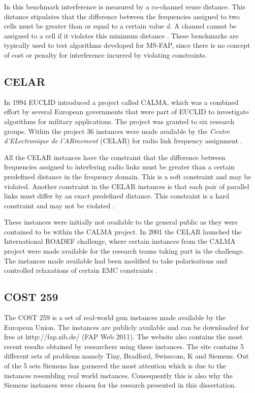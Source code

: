 In this benchmark interference is measured by a co-channel reuse distance\cite{Karen2004}. This distance stipulates that the difference between the frequencies  assigned to two cells must be greater than or equal to a certain value $d$. A channel cannot be assigned to a cell if it violates this minimum distance \cite{ExactMIFAP}.
These benchmarks are typically used to test algorithms developed for \gls{MS-FAP}, since there is no concept of cost or penalty for interference incurred by violating constraints.
\subsection{CELAR}
In 1994 \gls{EUCLID} introduced a project called CALMA, which was a combined effort by several European governments that were part of \gls{EUCLID} to investigate algorithms for military applications\cite{Karen2004}. The project was granted to six research groups. Within the project 36 instances were made available by the \emph{Centre d'ELectronique de l'ARmement} (CELAR) for radio link frequency assignment \cite{Karen2004,DynamicFAP}.

All the CELAR instances have the constraint that the difference between frequencies assigned to interfering radio links must be greater than a certain predefined distance in the frequency domain\cite{Karen2004}. This is a soft constraint and may be violated. Another constraint in the CELAR instances is that each pair of parallel links must differ by an exact predefined distance\cite{Karen2004}. This constraint is a hard constraint and may not be violated \cite{DynamicFAP}.

These instances were initially not available to the general public as they were contained to be within the CALMA project\cite{CALMA}. In 2001 the CELAR launched the International ROADEF challenge, where certain instances from the CALMA project were made available for the research teams taking part in the challenge\cite{CALMA}. The instances made available had been modified to take polarisations and controlled relaxations of certain EMC constraints \cite{LowerPolarFAP}.
\subsection{COST 259}
\label{sec:COST259}
The \gls{COST} 259 is a set of real-world \gls{gsm} instances made available by the European Union. The instances are publicly available and can  be downloaded for free at http://fap.zib.de/ (FAP Web 2011). The website also contains the most recent results obtained by researchers using these instances\cite{Karen2004,Eisenblatter}. The site contains 5 different sets of problems namely Tiny, Bradford, Swisscom, K and Siemens. Out of the 5 sets Siemens has garnered the most attention which is due to the instances resembling real world instances. Consequently this is also why the Siemens instances were chosen for the research presented in this dissertation.

